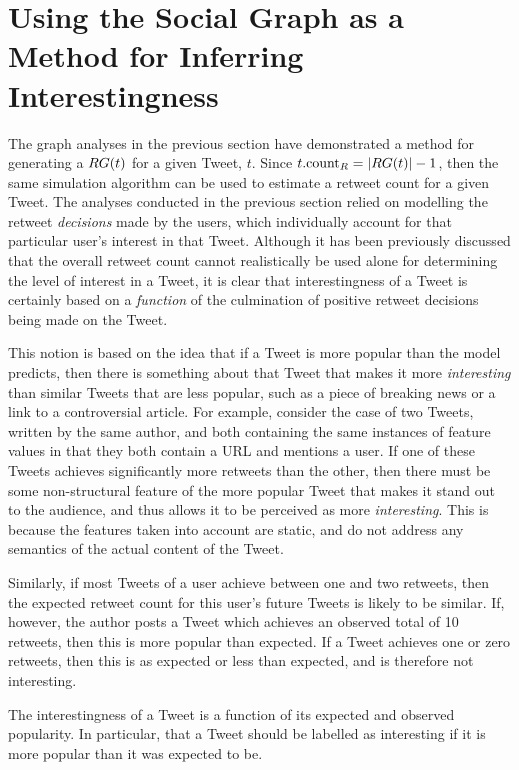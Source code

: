 \section{Using the Social Graph as a Method for Inferring Interestingness}
The graph analyses in the previous section have demonstrated a method for generating a $RG(t)$ for a given Tweet, $t$. Since $t.\textrm{count}_R = |RG(t)| - 1$, then the same simulation algorithm can be used to estimate a retweet count for a given Tweet. The analyses conducted in the previous section relied on modelling the retweet \textit{decisions} made by the users, which individually account for that particular user's interest in that Tweet. Although it has been previously discussed that the overall retweet count cannot realistically be used alone for determining the level of interest in a Tweet, it is clear that interestingness of a Tweet is certainly based on a \textit{function} of the culmination of positive retweet decisions being made on the Tweet.

This notion is based on the idea that if a Tweet is more popular than the model predicts, then there is something about that Tweet that makes it more \textit{interesting} than similar Tweets that are less popular, such as a piece of breaking news or a link to a controversial article. For example, consider the case of two Tweets, written by the same author, and both containing the same instances of feature values in that they both contain a URL and mentions a user. If one of these Tweets achieves significantly more retweets than the other, then there must be some non-structural feature of the more popular Tweet that makes it stand out to the audience, and thus allows it to be perceived as more \textit{interesting}. This is because the features taken into account are static, and do not address any semantics of the actual content of the Tweet.

Similarly, if most Tweets of a user achieve between one and two retweets, then the expected retweet count for this user's future Tweets is likely to be similar. If, however, the author posts a Tweet which achieves an observed total of 10 retweets, then this is more popular than expected. If a Tweet achieves one or zero retweets, then this is as expected or less than expected, and is therefore not interesting.

\begin{myproposition}
\label{proposition:1}
The interestingness of a Tweet is a function of its expected and observed popularity. In particular, that a Tweet should be labelled as interesting if it is more popular than it was expected to be.
\end{myproposition}

